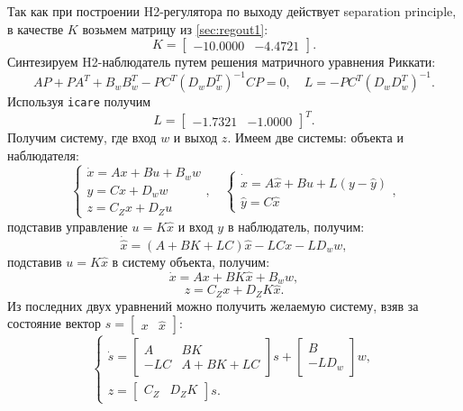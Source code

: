 Так как при построении H2-регулятора по выходу действует separation principle,
в качестве $K$ возьмем матрицу из \autoref{sec:regout1}:
\begin{equation*}
    K=\begin{bmatrix}
        -10.0000&-4.4721
    \end{bmatrix}.
\end{equation*}
Синтезируем H2-наблюдатель путем решения матричного уравнения Риккати:
\begin{equation}
    \label{eq:ric2}
    AP+PA^T+B_wB_w^T-PC^T(D_wD_w^T)^{-1}CP=0,\quad L=-PC^T(D_wD_w^T)^{-1}.
\end{equation}
Используя \texttt{icare} получим
\begin{equation*}
    L=\begin{bmatrix}
        -1.7321 &
        -1.0000
    \end{bmatrix}^T.
\end{equation*}
Получим систему, где вход $w$ и выход $z$. Имеем две системы: объекта и наблюдателя:
\begin{equation*}
    \begin{cases}
        \dot x=Ax+Bu+B_ww\\
        y=Cx+D_ww\\
        z=C_Zx+D_Zu
    \end{cases},\quad
    \begin{cases}
        \dot{\hat x}=A\hat x+Bu+L(y-\hat y)\\
        \hat y=C\hat x
    \end{cases},
\end{equation*}
подставив управление $u=K\hat x$ и вход $y$ в наблюдатель, получим:
\begin{equation*}
    \dot{\hat x}=(A+BK+LC)\hat x-LCx-LD_ww,
\end{equation*}
подставив $u=K\hat x$ в систему объекта, получим:
\begin{equation*}
    \dot x=Ax+BK\hat x+B_ww,
\end{equation*}
\begin{equation*}
    z=C_Zx+D_ZK\hat x.
\end{equation*}
Из последних двух уравнений можно получить желаемую систему, взяв за состояние вектор 
$s=\begin{bmatrix}
    x & \hat x
\end{bmatrix}$:
\begin{equation*}
    \begin{cases}
        \dot s=\begin{bmatrix}
            A & BK \\ -LC & A+BK+LC
        \end{bmatrix}s+\begin{bmatrix}
            B \\ -LD_w
        \end{bmatrix}w,\\[3ex]
        z=\begin{bmatrix}
            C_Z & D_ZK
        \end{bmatrix}s.
    \end{cases}
\end{equation*}
